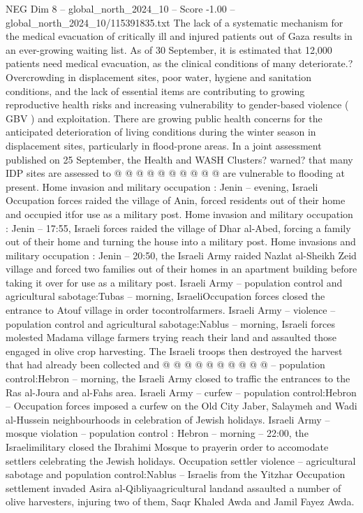 \begin{textsample}{NEG Dim 8 – global\_north\_2024\_10 – Score -1.00 – global\_north\_2024\_10/115391835.txt}
The lack of a systematic mechanism for the medical evacuation of critically ill and injured patients out of Gaza results in an ever-growing waiting list.
As of 30 September, it is estimated that 12,000 patients need medical evacuation, as the clinical conditions of many deteriorate.?
Overcrowding in displacement sites, poor water, hygiene and sanitation conditions, and the lack of essential items are contributing to growing reproductive health risks and increasing vulnerability to gender-based violence ( GBV ) and exploitation.
There are growing public health concerns for the anticipated deterioration of living conditions during the winter season in displacement sites, particularly in flood-prone areas.
In a joint assessment published on 25 September, the Health and WASH Clusters? warned? that many IDP sites are assessed to @ @ @ @ @ @ @ @ @ @ are vulnerable to flooding at present.
Home invasion and military occupation : Jenin -- evening, Israeli Occupation forces raided the village of Anin, forced residents out of their home and occupied itfor use as a military post.
Home invasion and military occupation : Jenin -- 17:55, Israeli forces raided the village of Dhar al-Abed, forcing a family out of their home and turning the house into a military post.
Home invasions and military occupation : Jenin -- 20:50, the Israeli Army raided Nazlat al-Sheikh Zeid village and forced two families out of their homes in an apartment building before taking it over for use as a military post.
Israeli Army -- population control and agricultural sabotage:Tubas -- morning, IsraeliOccupation forces closed the entrance to Atouf village in order tocontrolfarmers.
Israeli Army -- violence -- population control and agricultural sabotage:Nablus -- morning, Israeli forces molested Madama village farmers trying reach their land and assaulted those engaged in olive crop harvesting.
The Israeli troops then destroyed the harvest that had already been collected and @ @ @ @ @ @ @ @ @ @ -- population control:Hebron -- morning, the Israeli Army closed to traffic the entrances to the Ras al-Joura and al-Fahs area.
Israeli Army -- curfew -- population control:Hebron -- Occupation forces imposed a curfew on the Old City Jaber, Salaymeh and Wadi al-Hussein neighbourhoods in celebration of Jewish holidays.
Israeli Army -- mosque violation -- population control : Hebron -- morning -- 22:00, the Israelimilitary closed the Ibrahimi Mosque to prayerin order to accomodate settlers celebrating the Jewish holidays.
Occupation settler violence -- agricultural sabotage and population control:Nablus -- Israelis from the Yitzhar Occupation settlement invaded Asira al-Qibliyaagricultural landand assaulted a number of olive harvesters, injuring two of them, Saqr Khaled Awda and Jamil Fayez Awda.

\end{textsample}
